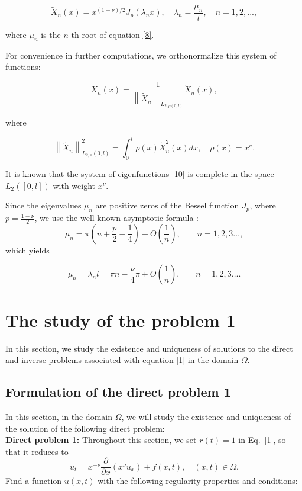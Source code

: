 \documentclass[reqno]{amsart}
\theoremstyle{definition}
\numberwithin{equation}{section}
\begin{document}
\begin{equation*}
    \widetilde{X}_n(x)=x^{(1-\nu)/2}J_p(\lambda_nx), \quad \lambda_n=\frac{\mu_n}{l}, \quad n=1,2,...,
\end{equation*}
 
where $\mu_n$ is the $n$-th root of equation \eqref{8}.

For convenience in further computations, we orthonormalize this system of functions:

\begin{equation}\label{10}
    X_n(x)=\frac{1}{\left\|\widetilde{X}_n\right\|_{L_{2, \rho(0,l)}}}\widetilde{X}_n(x),
\end{equation}

where 

\begin{equation}\label{11}
    \left\|\widetilde{X}_n\right\|_{L_{2, \rho}(0,l)}^2=\int_0^l\rho(x) \widetilde{X}_n^2(x) d x, \quad \rho(x)=x^\nu.
    \end{equation}

It is known \cite{Watson} that the system of eigenfunctions \eqref{10} is complete in the space $L_2([0,l])$ with weight $x^\nu$.

 

Since the eigenvalues $\mu_n$ are positive zeros of the Bessel function
$J_p$, where $p=\frac{1-\nu}{2}$, we use the well-known asymptotic formula \cite{Olver}:
\begin{equation*}
    \mu_n=\pi\left(n+\frac{p}{2}-\frac14\right)+O\!\left(\frac{1}{n}\right),
\qquad n=1,2,3\dots,
\end{equation*}
which yields

\begin{equation}\label{12}
    \mu_n=\lambda_n l=\pi n-\frac{\nu}{4} \pi+O\left(\frac{1}{n}\right). \qquad n=1,2,3\dots.
\end{equation}


\section{The study of the problem 1}
In this section, we study the existence and uniqueness of solutions to the direct and inverse problems associated with equation \eqref{1} in the domain $\Omega$.

\subsection{Formulation of the direct problem 1}
In this section, in the domain $\Omega$, we will study the existence and uniqueness of the solution
of the following direct problem:\\
\textbf{Direct problem 1:} Throughout this section, we set $r(t)=1$ in Eq.~\eqref{1}, 
so that it reduces to
\begin{equation}\label{rt=1}
    u_t = x^{-\nu}\frac{\partial}{\partial x}\left(x^{\nu}u_x\right) + f(x,t),
    \quad (x,t)\in\Omega.
\end{equation}
Find a function $u(x, t)$ with the following regularity properties and conditions:
\end{document}
